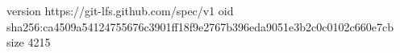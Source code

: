 version https://git-lfs.github.com/spec/v1
oid sha256:ca4509a54124755676c3901ff18f9e2767b396eda9051e3b2c0c0102c660e7cb
size 4215
